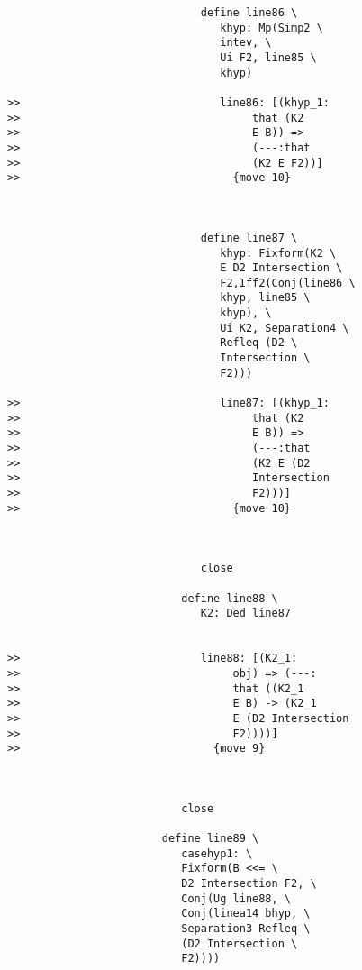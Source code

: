 \documentclass[12pt]{article}
\begin{document}
\begin{verbatim}
                              define line86 \
                                 khyp: Mp(Simp2 \
                                 intev, \
                                 Ui F2, line85 \
                                 khyp)

>>                               line86: [(khyp_1:
>>                                    that (K2
>>                                    E B)) =>
>>                                    (---:that
>>                                    (K2 E F2))]
>>                                 {move 10}



                              define line87 \
                                 khyp: Fixform(K2 \
                                 E D2 Intersection \
                                 F2,Iff2(Conj(line86 \
                                 khyp, line85 \
                                 khyp), \
                                 Ui K2, Separation4 \
                                 Refleq (D2 \
                                 Intersection \
                                 F2)))

>>                               line87: [(khyp_1:
>>                                    that (K2
>>                                    E B)) =>
>>                                    (---:that
>>                                    (K2 E (D2
>>                                    Intersection
>>                                    F2)))]
>>                                 {move 10}



                              close

                           define line88 \
                              K2: Ded line87


>>                            line88: [(K2_1:
>>                                 obj) => (---:
>>                                 that ((K2_1
>>                                 E B) -> (K2_1
>>                                 E (D2 Intersection
>>                                 F2))))]
>>                              {move 9}



                           close

                        define line89 \
                           casehyp1: \
                           Fixform(B <<= \
                           D2 Intersection F2, \
                           Conj(Ug line88, \
                           Conj(linea14 bhyp, \
                           Separation3 Refleq \
                           (D2 Intersection \
                           F2))))


\end{verbatim}
\end{document}
